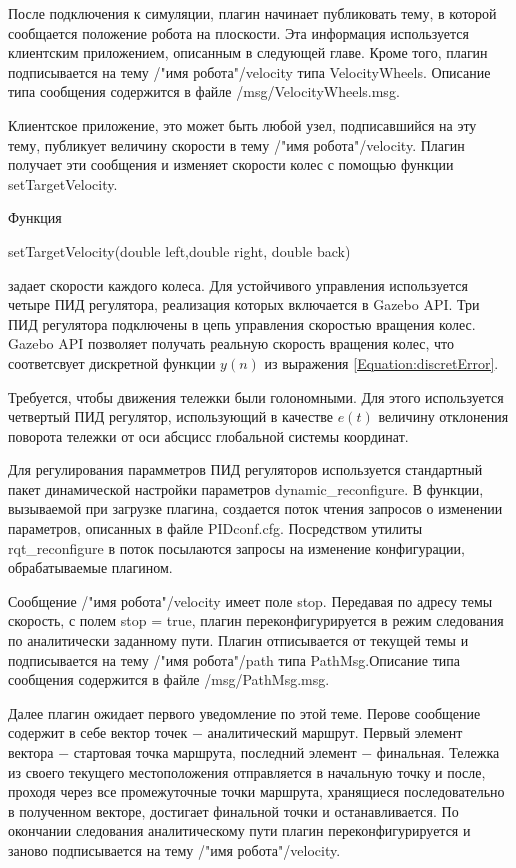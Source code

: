 \documentclass[oneside,final,14pt]{extreport}
\begin{document}
После подключения к симуляции, плагин начинает публиковать тему, в которой сообщается положение робота на плоскости. Эта информация используется клиентским приложением, описанным в следующей главе. 
Кроме того, плагин подписывается на тему /"имя робота"/velocity типа VelocityWheels. Описание типа сообщения содержится в файле /msg/VelocityWheels.msg. 

Клиентское приложение, это может быть любой узел, подписавшийся на эту тему, публикует величину скорости в тему  /"имя робота"/velocity. Плагин получает эти сообщения и изменяет скорости колес с помощью функции setTargetVelocity.

Функция  

setTargetVelocity(double left,double right, double back) 

задает скорости каждого колеса. Для устойчивого управления используется четыре ПИД регулятора, реализация которых включается в Gazebo API. Три ПИД регулятора подключены в цепь управления скоростью вращения колес. Gazebo API  позволяет получать реальную скорость вращения колес, что соответсвует дискретной функции $y(n)$ из выражения \ref{Equation:discretError}.  

Требуется, чтобы движения тележки  были голономными. Для этого используется четвертый ПИД регулятор, использующий в качестве $e(t)$ величину отклонения поворота тележки от оси абсцисс  глобальной системы координат.

Для регулирования парамметров ПИД регуляторов используется стандартный пакет динамической настройки параметров dynamic_reconfigure. В функции, вызываемой при загрузке плагина, создается поток чтения запросов о изменении параметров, описанных в файле PIDconf.cfg.  Посредством утилиты  rqt_reconfigure  в поток посылаются запросы на изменение конфигурации, обрабатываемые плагином. 


Сообщение /"имя робота"/velocity имеет поле stop. Передавая по адресу темы скорость, с полем stop = true, плагин переконфигурируется в режим следования по аналитически заданному пути. Плагин отписывается от текущей темы и подписывается на тему /"имя робота"/path типа PathMsg.Описание типа сообщения содержится в файле /msg/PathMsg.msg. 

Далее плагин ожидает первого уведомление по этой теме. Перове сообщение содержит в себе вектор точек $-$ аналитический маршрут. Первый элемент вектора $-$ стартовая точка маршрута, последний элемент $-$ финальная. Тележка из своего текущего местоположения отправляется в начальную точку и после, проходя через все промежуточные точки маршрута, хранящиеся последовательно в полученном векторе, достигает финальной точки и останавливается. По окончании следования аналитическому пути плагин переконфигурируется и заново подписывается на тему  /"имя робота"/velocity.
\end{document}
